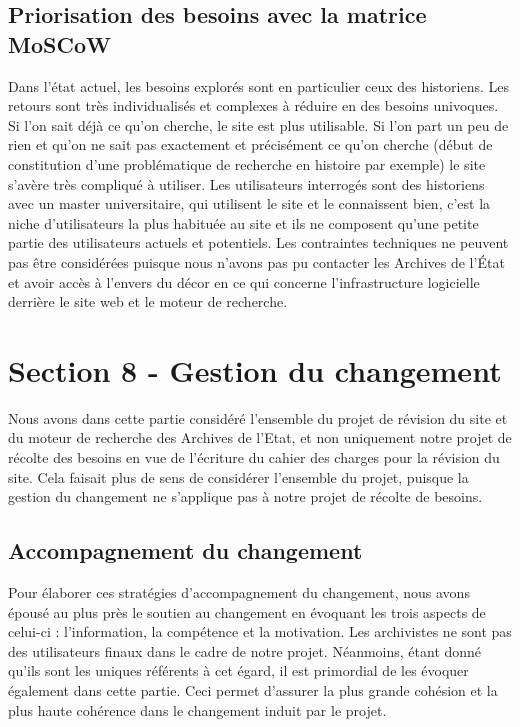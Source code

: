 \documentclass[a4paper,12pt]{article}
\begin{document}
\subsection{Priorisation des besoins avec la matrice MoSCoW}
Dans l’état actuel, les besoins explorés sont en particulier ceux des historiens. Les retours sont très individualisés et complexes à réduire en des besoins univoques. Si l’on sait déjà ce qu’on cherche, le site est plus utilisable. Si l’on part un peu de rien et qu’on ne sait pas exactement et précisément ce qu’on cherche (début de constitution d’une problématique de recherche en histoire par exemple) le site s'avère très compliqué à utiliser. Les utilisateurs interrogés sont des historiens avec un master universitaire, qui utilisent le site et le connaissent bien, c’est la niche d’utilisateurs la plus habituée au site et ils ne composent qu'une petite partie des utilisateurs actuels et potentiels.
Les contraintes techniques ne peuvent pas être considérées puisque nous n’avons pas pu contacter les Archives de l’État et avoir accès à l’envers du décor en ce qui concerne l’infrastructure logicielle derrière le site web et le moteur de recherche.

\section{Section 8 - Gestion du changement}
Nous avons dans cette partie considéré l'ensemble du projet de révision du site et du moteur de recherche des Archives de l'Etat, et non uniquement notre projet de récolte des besoins en vue de l'écriture du cahier des charges pour la révision du site. Cela faisait plus de sens de considérer l'ensemble du projet, puisque la gestion du changement ne s'applique pas à notre projet de récolte de besoins.

\subsection{Accompagnement du changement}
Pour élaborer ces stratégies d’accompagnement du changement, nous avons épousé au plus près le soutien au changement en évoquant les trois aspects de celui-ci : l'information, la compétence et la motivation.
Les archivistes ne sont pas des utilisateurs finaux dans le cadre de notre projet. Néanmoins, étant donné qu’ils sont les uniques référents à cet égard, il est primordial de les évoquer également dans cette partie. Ceci permet d’assurer la plus grande cohésion et la plus haute cohérence dans le changement induit par le projet.
\end{document}
